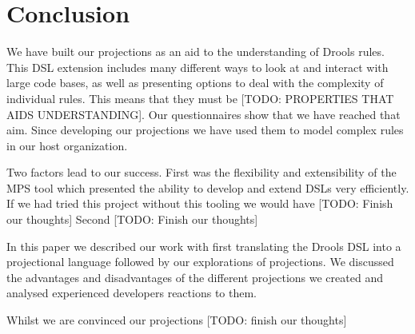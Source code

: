 \chapter{Conclusion}\label{chapter:Conclusion}

We have built our projections as an aid to the understanding of Drools rules.
This DSL extension includes many different ways to look at and interact with large code bases, as well as presenting options to deal with the complexity of individual rules.
This means that they must be [TODO: PROPERTIES THAT AIDS UNDERSTANDING].
Our questionnaires show that we have reached that aim.
Since developing our projections we have used them to model complex rules in our host organization.

Two factors lead to our success.
First was the flexibility and extensibility of the MPS tool which presented the ability to develop and extend DSLs very efficiently.
If we had tried this project without this tooling we would have [TODO: Finish our thoughts]
Second [TODO: Finish our thoughts]

In this paper we described our work with first translating the Drools DSL into a projectional language followed by our explorations of projections.
We discussed the advantages and disadvantages of the different projections we created and analysed experienced developers reactions to them.

Whilst we are convinced our projections [TODO: finish our thoughts]

